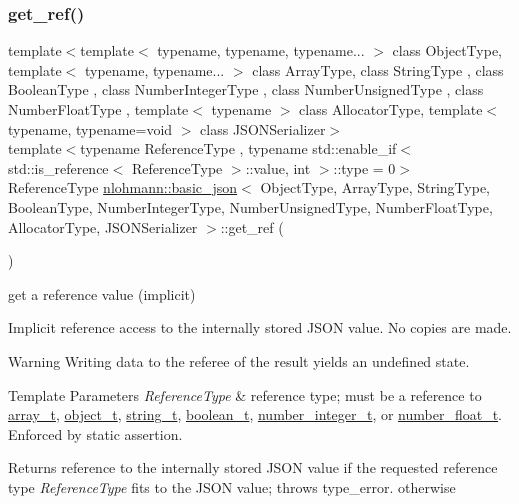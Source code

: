 \subsubsection{\texorpdfstring{get\+\_\+ref()}{get\_ref()}\hspace{0.1cm}{\footnotesize\ttfamily [1/2]}}
{\footnotesize\ttfamily template$<$template$<$ typename, typename, typename... $>$ class Object\+Type, template$<$ typename, typename... $>$ class Array\+Type, class String\+Type , class Boolean\+Type , class Number\+Integer\+Type , class Number\+Unsigned\+Type , class Number\+Float\+Type , template$<$ typename $>$ class Allocator\+Type, template$<$ typename, typename=void $>$ class J\+S\+O\+N\+Serializer$>$ \\
template$<$typename Reference\+Type , typename std\+::enable\+\_\+if$<$ std\+::is\+\_\+reference$<$ Reference\+Type $>$\+::value, int $>$\+::type  = 0$>$ \\
Reference\+Type \hyperlink{classnlohmann_1_1basic__json}{nlohmann\+::basic\+\_\+json}$<$ Object\+Type, Array\+Type, String\+Type, Boolean\+Type, Number\+Integer\+Type, Number\+Unsigned\+Type, Number\+Float\+Type, Allocator\+Type, J\+S\+O\+N\+Serializer $>$\+::get\+\_\+ref (\begin{DoxyParamCaption}{ }\end{DoxyParamCaption})\hspace{0.3cm}{\ttfamily [inline]}}



get a reference value (implicit) 

Implicit reference access to the internally stored J\+S\+ON value. No copies are made.

\begin{DoxyWarning}{Warning}
Writing data to the referee of the result yields an undefined state.
\end{DoxyWarning}

\begin{DoxyTemplParams}{Template Parameters}
{\em Reference\+Type} & reference type; must be a reference to \hyperlink{classnlohmann_1_1basic__json_ae095578e03df97c5b3991787f1056374}{array\+\_\+t}, \hyperlink{classnlohmann_1_1basic__json_a5e48a7893520e1314bf0c9723e26ea2a}{object\+\_\+t}, \hyperlink{classnlohmann_1_1basic__json_a61f8566a1a85a424c7266fb531dca005}{string\+\_\+t}, \hyperlink{classnlohmann_1_1basic__json_a4c919102a9b4fe0d588af64801436082}{boolean\+\_\+t}, \hyperlink{classnlohmann_1_1basic__json_a98e611d67b7bd75307de99c9358ab2dc}{number\+\_\+integer\+\_\+t}, or \hyperlink{classnlohmann_1_1basic__json_a88d6103cb3620410b35200ee8e313d97}{number\+\_\+float\+\_\+t}. Enforced by static assertion.\\
\hline
\end{DoxyTemplParams}
\begin{DoxyReturn}{Returns}
reference to the internally stored J\+S\+ON value if the requested reference type {\itshape Reference\+Type} fits to the J\+S\+ON value; throws type\+\_\+error. otherwise
\end{DoxyReturn}

